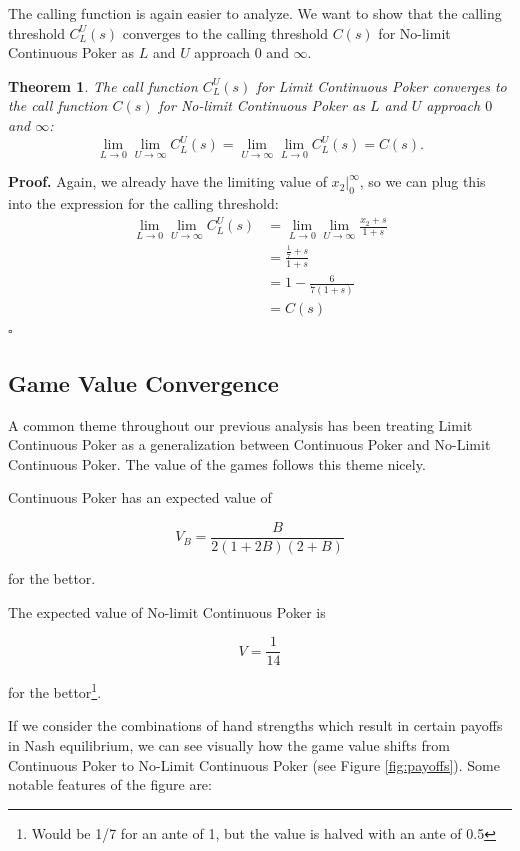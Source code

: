 \documentclass[a4paper,12pt]{article}
\theoremstyle{plain}
\newtheorem{theorem}{Theorem}[section]
\theoremstyle{definition}
\newenvironment{customproof}[1][Proof]{\noindent\textbf{#1.} }{\hfill$\square$\vspace{1em}}
\begin{document}
The calling function is again easier to analyze. We want to show that the calling threshold $C_L^U(s)$ converges to the calling threshold $C(s)$ for No-limit Continuous Poker as $L$ and $U$ approach $0$ and $\infty$.
\begin{theorem}
    The call function $C_L^U(s)$ for Limit Continuous Poker converges to the call function $C(s)$ for No-limit Continuous Poker as $L$ and $U$ approach $0$ and $\infty$:
\[
\lim_{L \to 0} \lim_{U \to \infty} C_L^U(s) = \lim_{U \to \infty} \lim_{L \to 0} C_L^U(s) = C(s).
\]
\end{theorem}
\begin{customproof}
Again, we already have the limiting value of $x_2|_0^\infty$, so we can plug this into the expression for the calling threshold:
\begin{align*}
    \lim_{L \to 0} \lim_{U \to \infty} C_L^U(s) & = \lim_{L \to 0} \lim_{U \to \infty} \frac{x_2+s}{1+s}\\
    & = \frac{\frac{1}{7}+s}{1+s}\\
    & = 1 - \frac{6}{7(1+s)}\\
    & = C(s)
\end{align*}
\end{customproof}


\subsection{Game Value Convergence}

A common theme throughout our previous analysis has been treating Limit Continuous Poker as a generalization between Continuous Poker and No-Limit Continuous Poker. The value of the games follows this theme nicely.

Continuous Poker has an expected value of 

$$ V_B = \frac{B}{2(1+2B)(2+B)} $$

for the bettor. 

The expected value of No-limit Continuous Poker is 

$$ V = \frac{1}{14} $$

for the bettor\footnote{Would be 1/7 for an ante of 1, but the value is halved with an ante of 0.5}. 


If we consider the combinations of hand strengths which result in certain payoffs in Nash equilibrium, we can see visually how the game value shifts from Continuous Poker to No-Limit Continuous Poker (see Figure \ref{fig:payoffs}). Some notable features of the figure are:
\end{document}
